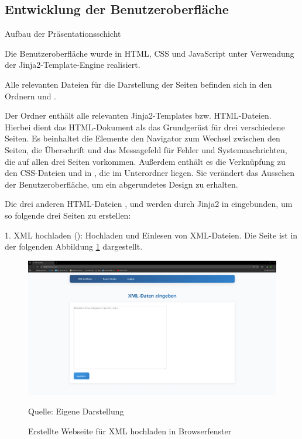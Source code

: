 \subsection{Entwicklung der Benutzeroberfläche}
\label{subsec:entwicklung-der-benutzeroberflache}
Aufbau der Präsentationsschicht


Die Benutzeroberfläche wurde in HTML, CSS und JavaScript unter Verwendung der Jinja2-Template-Engine realisiert.

Alle relevanten Dateien für die Darstellung der Seiten befinden sich in den Ordnern  und .

Der Ordner  enthält alle relevanten Jinja2-Templates bzw. HTML-Dateien.
Hierbei dient das HTML-Dokument  als das Grundgerüst für drei verschiedene Seiten.
Es beinhaltet die Elemente den Navigator zum Wechsel zwischen den Seiten, die Überschrift und das Messagefeld für Fehler und Systemnachrichten, die auf allen drei Seiten vorkommen.
Außerdem enthält es die Verknüpfung zu den CSS-Dateien  und  in , die im Unterordner  liegen.
Sie verändert das Aussehen der Benutzeroberfläche, um ein abgerundetes Design zu erhalten.

Die drei anderen HTML-Dateien ,  und  werden durch Jinja2 in  eingebunden, um so folgende drei Seiten zu erstellen:

1. XML hochladen (): Hochladen und Einlesen von XML-Dateien.
Die Seite ist in der folgenden Abbildung \ref{fig: Webseite für XML hochladen} dargestellt.

\begin{figure}[H]
    \centering
    \includegraphics[width=1\textwidth]{Grafiken/Bild XML hochladen}
    \caption{Erstellte Webseite für XML hochladen in Browserfenster}
    \label{fig: Webseite für XML hochladen}
    {Quelle: Eigene Darstellung}
\end{figure}

